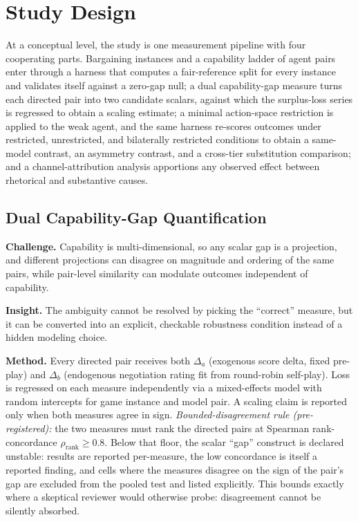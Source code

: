 \documentclass[conference]{IEEEtran}
\begin{document}
\section{Study Design}
\label{sec:design}

At a conceptual level, the study is one measurement pipeline with four cooperating parts. Bargaining instances and a capability ladder of agent pairs enter through a harness that computes a fair-reference split for every instance and validates itself against a zero-gap null; a dual capability-gap measure turns each directed pair into two candidate scalars, against which the surplus-loss series is regressed to obtain a scaling estimate; a minimal action-space restriction is applied to the weak agent, and the same harness re-scores outcomes under restricted, unrestricted, and bilaterally restricted conditions to obtain a same-model contrast, an asymmetry contrast, and a cross-tier substitution comparison; and a channel-attribution analysis apportions any observed effect between rhetorical and substantive causes.

\subsection{Dual Capability-Gap Quantification}

\textbf{Challenge.} Capability is multi-dimensional, so any scalar gap is a projection, and different projections can disagree on magnitude and ordering of the same pairs, while pair-level similarity can modulate outcomes independent of capability.

\textbf{Insight.} The ambiguity cannot be resolved by picking the ``correct'' measure, but it can be converted into an explicit, checkable robustness condition instead of a hidden modeling choice.

\textbf{Method.} Every directed pair receives both $\Delta_a$ (exogenous score delta, fixed pre-play) and $\Delta_b$ (endogenous negotiation rating fit from round-robin self-play). Loss is regressed on each measure independently via a mixed-effects model with random intercepts for game instance and model pair. A scaling claim is reported only when both measures agree in sign. \emph{Bounded-disagreement rule (pre-registered):} the two measures must rank the directed pairs at Spearman rank-concordance $\rho_{\mathrm{rank}} \geq 0.8$. Below that floor, the scalar ``gap'' construct is declared unstable: results are reported per-measure, the low concordance is itself a reported finding, and cells where the measures disagree on the sign of the pair's gap are excluded from the pooled test and listed explicitly. This bounds exactly where a skeptical reviewer would otherwise probe: disagreement cannot be silently absorbed.
\end{document}
